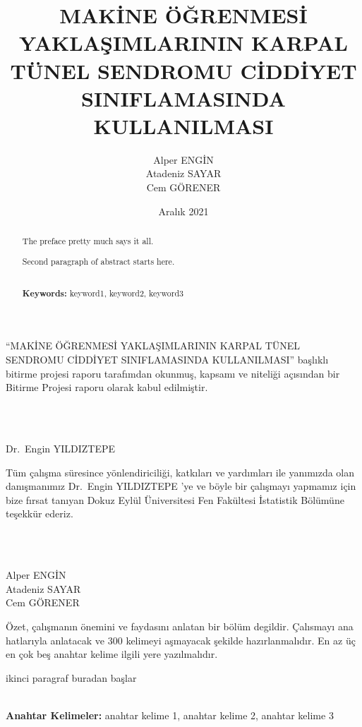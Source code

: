\documentclass[12pt,twoside]{deuthesis}
\title{MAKİNE ÖĞRENMESİ YAKLAŞIMLARININ KARPAL TÜNEL SENDROMU CİDDİYET SINIFLAMASINDA KULLANILMASI}
\author{Alper ENGİN \\ Atadeniz SAYAR \\ Cem GÖRENER} %
\date{Aralık 2021}
\begin{document}
  \maketitle

\frontmatter %
\pagestyle{empty} %
\begin{preface}
	``MAKİNE ÖĞRENMESİ YAKLAŞIMLARININ KARPAL TÜNEL SENDROMU CİDDİYET SINIFLAMASINDA KULLANILMASI'' başlıklı bitirme projesi raporu tarafımdan okunmuş, kapsamı ve niteliği açısından bir Bitirme Projesi raporu olarak kabul edilmiştir.\\
 \strut \\
 \strut \\
 Dr.~Engin YILDIZTEPE
\end{preface}
  \begin{acknowledgements}
    Tüm çalışma süresince yönlendiriciliği, katkıları ve yardımları ile yanımızda olan danışmanımız Dr.~Engin YILDIZTEPE 'ye ve böyle bir çalışmayı yapmamız için bize fırsat tanıyan Dokuz Eylül Üniversitesi Fen Fakültesi İstatistik Bölümüne teşekkür ederiz.\\
    \strut \\
    \strut \\
    Alper ENGİN\\
    Atadeniz SAYAR\\
    Cem GÖRENER\\
  \end{acknowledgements}
\begin{abstractTR}
	Özet, çalışmanın önemini ve faydasını anlatan bir bölüm degildir. Çalısmayı ana
 hatlarıyla anlatacak ve 300 kelimeyi aşmayacak şekilde hazırlanmalıdır. En az üç en
 çok beş anahtar kelime ilgili yere yazılmalıdır.

 \par

 ikinci paragraf buradan başlar\\
 \strut \\
 \textbf{Anahtar Kelimeler:} anahtar kelime 1, anahtar kelime 2, anahtar kelime 3
\end{abstractTR}
\begin{abstract}
	The preface pretty much says it all.

 \par

 Second paragraph of abstract starts here.\\
 \strut \\
 \textbf{Keywords:} keyword1, keyword2, keyword3
\end{abstract}
\end{document}
